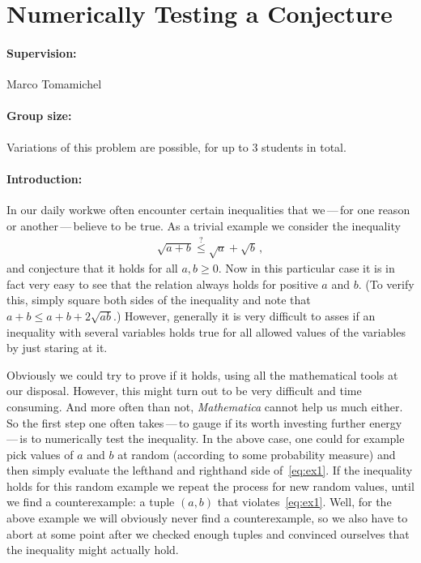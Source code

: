 \documentclass[aps,pra,onecolumn,nofootinbib,superscriptaddress,tightenlines,
notitlepage,12pt]{revtex4-1}
\begin{document}
\section{Numerically Testing a Conjecture}

\paragraph*{Supervision:} Marco Tomamichel

\paragraph*{Group size:} Variations of this problem are possible, for up to 3 students in total.

\paragraph*{Introduction:} In our daily workwe often encounter certain inequalities that we\,---\,for one reason or another\,---\,believe to be true. 
%
As a trivial example we consider the inequality
\begin{align}
  \sqrt{a + b} \stackrel{?}{\leq} \sqrt{a} + \sqrt{b} \,, \label{eq:ex1}
\end{align}
and conjecture that it holds for all $a, b \geq 0$.
Now in this particular case it is in fact very easy to see that the relation always holds for positive $a$ and $b$. (To verify this, simply  square both sides of the inequality and note that $a + b \leq a + b + 2\sqrt{ab}$.) However, generally it is very difficult to asses if an inequality with several variables holds true for all allowed values of the variables by just staring at it. 

Obviously we could try to prove if it holds, using all the mathematical tools at our disposal. However, this might turn out to be very difficult and time consuming. And more often than not, \emph{Mathematica} cannot help us much either.
%
So the first step one often takes\,---\,to gauge if its worth investing further energy\,---\,is to numerically test the inequality. In the above case, one could for example pick values of $a$ and $b$ at random (according to some probability measure) and then simply evaluate the lefthand and righthand side of~\eqref{eq:ex1}. If the inequality holds for this random example we repeat the process for new random values, until we find a counterexample: a tuple $(a,b)$ that violates~\eqref{eq:ex1}. Well, for the above example we will obviously never find a counterexample, so we also have to abort at some point after we checked enough tuples and convinced ourselves that the inequality might actually hold.
\end{document}
